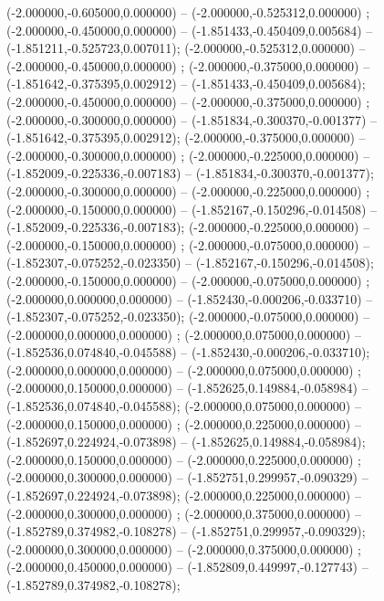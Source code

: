  (-2.000000,-0.605000,0.000000) -- (-2.000000,-0.525312,0.000000) ;
 (-2.000000,-0.450000,0.000000) -- (-1.851433,-0.450409,0.005684) -- (-1.851211,-0.525723,0.007011);
 (-2.000000,-0.525312,0.000000) -- (-2.000000,-0.450000,0.000000) ;
 (-2.000000,-0.375000,0.000000) -- (-1.851642,-0.375395,0.002912) -- (-1.851433,-0.450409,0.005684);
 (-2.000000,-0.450000,0.000000) -- (-2.000000,-0.375000,0.000000) ;
 (-2.000000,-0.300000,0.000000) -- (-1.851834,-0.300370,-0.001377) -- (-1.851642,-0.375395,0.002912);
 (-2.000000,-0.375000,0.000000) -- (-2.000000,-0.300000,0.000000) ;
 (-2.000000,-0.225000,0.000000) -- (-1.852009,-0.225336,-0.007183) -- (-1.851834,-0.300370,-0.001377);
 (-2.000000,-0.300000,0.000000) -- (-2.000000,-0.225000,0.000000) ;
 (-2.000000,-0.150000,0.000000) -- (-1.852167,-0.150296,-0.014508) -- (-1.852009,-0.225336,-0.007183);
 (-2.000000,-0.225000,0.000000) -- (-2.000000,-0.150000,0.000000) ;
 (-2.000000,-0.075000,0.000000) -- (-1.852307,-0.075252,-0.023350) -- (-1.852167,-0.150296,-0.014508);
 (-2.000000,-0.150000,0.000000) -- (-2.000000,-0.075000,0.000000) ;
 (-2.000000,0.000000,0.000000) -- (-1.852430,-0.000206,-0.033710) -- (-1.852307,-0.075252,-0.023350);
 (-2.000000,-0.075000,0.000000) -- (-2.000000,0.000000,0.000000) ;
 (-2.000000,0.075000,0.000000) -- (-1.852536,0.074840,-0.045588) -- (-1.852430,-0.000206,-0.033710);
 (-2.000000,0.000000,0.000000) -- (-2.000000,0.075000,0.000000) ;
 (-2.000000,0.150000,0.000000) -- (-1.852625,0.149884,-0.058984) -- (-1.852536,0.074840,-0.045588);
 (-2.000000,0.075000,0.000000) -- (-2.000000,0.150000,0.000000) ;
 (-2.000000,0.225000,0.000000) -- (-1.852697,0.224924,-0.073898) -- (-1.852625,0.149884,-0.058984);
 (-2.000000,0.150000,0.000000) -- (-2.000000,0.225000,0.000000) ;
 (-2.000000,0.300000,0.000000) -- (-1.852751,0.299957,-0.090329) -- (-1.852697,0.224924,-0.073898);
 (-2.000000,0.225000,0.000000) -- (-2.000000,0.300000,0.000000) ;
 (-2.000000,0.375000,0.000000) -- (-1.852789,0.374982,-0.108278) -- (-1.852751,0.299957,-0.090329);
 (-2.000000,0.300000,0.000000) -- (-2.000000,0.375000,0.000000) ;
 (-2.000000,0.450000,0.000000) -- (-1.852809,0.449997,-0.127743) -- (-1.852789,0.374982,-0.108278);

